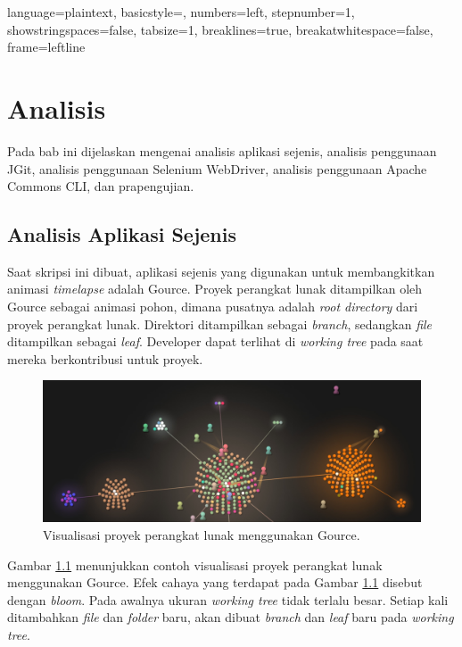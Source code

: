 
\lstset
{ 
    language=plaintext,
    basicstyle=\footnotesize,
    numbers=left,
    stepnumber=1,
    showstringspaces=false,
    tabsize=1,
    breaklines=true,
    breakatwhitespace=false,
    frame=leftline
}

\chapter{Analisis}
\label{chap:analisis}

Pada bab ini dijelaskan mengenai analisis aplikasi sejenis, analisis penggunaan JGit, analisis penggunaan Selenium WebDriver, analisis penggunaan Apache Commons CLI, dan prapengujian. 

\section{Analisis Aplikasi Sejenis}
\label{sec:analisis_aplikasi_sejenis}
Saat skripsi ini dibuat, aplikasi sejenis yang digunakan untuk membangkitkan animasi \textit{timelapse} adalah Gource.  
Proyek perangkat lunak ditampilkan oleh Gource sebagai animasi pohon, dimana pusatnya adalah \textit{root directory} dari proyek perangkat lunak\cite{Gource}. Direktori ditampilkan sebagai \textit{branch}, sedangkan \textit{file} ditampilkan sebagai \textit{leaf}. Developer dapat terlihat di \textit{working tree} pada saat mereka berkontribusi untuk proyek.


\begin{figure}[H]
	\centering
		\includegraphics[scale=0.2]{Gambar/gource.jpg}
	\caption{Visualisasi proyek perangkat lunak menggunakan Gource.}
	\label{fig:gource}
\end{figure}

Gambar \ref{fig:gource} menunjukkan contoh visualisasi proyek perangkat lunak menggunakan Gource. Efek cahaya yang terdapat pada Gambar \ref{fig:gource} disebut dengan \textit{bloom}. Pada awalnya ukuran \textit{working tree} tidak terlalu besar. Setiap kali ditambahkan \textit{file} dan \textit{folder} baru, akan dibuat \textit{branch} dan \textit{leaf} baru pada \textit{working tree}.  

